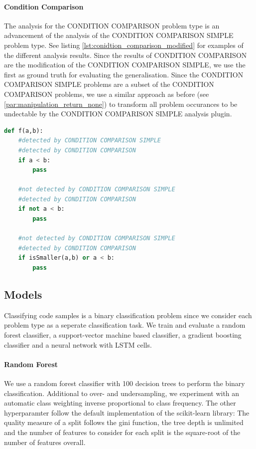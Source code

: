 \paragraph{Condition Comparison}
The analysis for the CONDITION COMPARISON problem type is an advancement of the analysis of the CONDITION COMPARISON SIMPLE problem type.  See listing \ref{lst:conidtion_comparison_modified} for examples of the different analysis results.
Since the results of CONDITION COMPARISON are the modification of the CONDITION COMPARISON SIMPLE, we use the first as ground truth for evaluating the generalisation. Since the CONDITION COMPARISON SIMPLE problems are a subset of the CONDITION COMPARISON problems, we use a similar approach as before (see \ref{par:manipulation_return_none}) to transform all problem occurances to be undectable by the CONDITION COMPARISON SIMPLE analysis plugin.

\begin{lstlisting}[language=Python, label=lst:conidtion_comparison_modified, caption={Sample statements for the differnce between the two analysis plugins CONDITION COMPARISON and CONDITION COMPARISON SIMPLE.  }]
    def f(a,b):
    #detected by CONDITION COMPARISON SIMPLE
    #detected by CONDITION COMPARISON
    if a < b:
        pass 

    #not detected by CONDITION COMPARISON SIMPLE
    #detected by CONDITION COMPARISON
    if not a < b:
        pass 

    #not detected by CONDITION COMPARISON SIMPLE
    #detected by CONDITION COMPARISON
    if isSmaller(a,b) or a < b:
        pass \end{lstlisting}

\subsection{Models}
Classifying code samples is a binary classification problem since we consider each problem type as a seperate classification task. We train and evaluate a random forest classifier, a support-vector machine based classifier, a gradient boosting classifier and a neural network with LSTM cells.

\paragraph{Random Forest}
We use a random forest classifier with 100 decision trees to perform the binary classification. Additional to over- and undersampling, we experiment with an automatic class weighting inverse proportional to class frequency. The other hyperparamter follow the default implementation of the scikit-learn library: The quality measure of a split follows the gini function, the tree depth is unlimited and the number of features to consider for each split is the square-root of the number of features overall.
